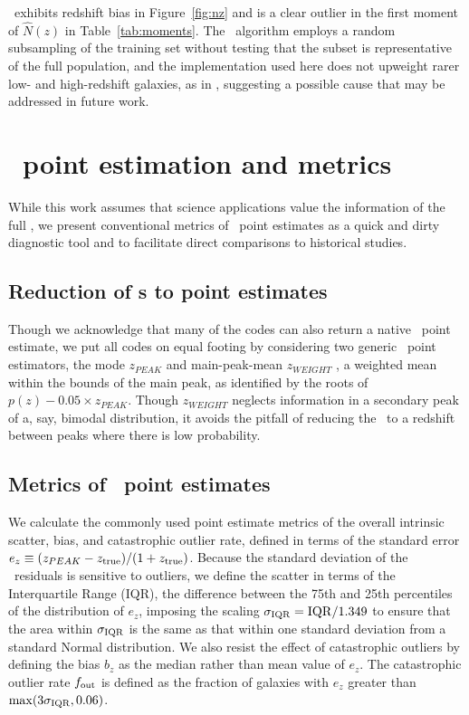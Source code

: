 \skynet\ exhibits redshift bias in Figure~\ref{fig:nz} and is a clear outlier in the first moment of $\hat{N}(z)$ in Table~\ref{tab:moments}.
The \skynet\ algorithm employs a random subsampling of the training set without testing that the subset is representative of the full population, and the implementation used here does not upweight rarer low- and high-redshift galaxies, as in \citet{Bonnett:15}, suggesting a possible cause that may be addressed in future work.

\section{\Pz\ point estimation and metrics}

While this work assumes that science applications value the information of the full \pzpdf, we present conventional metrics of \pz\ point estimates as a quick and dirty diagnostic tool and to facilitate direct comparisons to historical studies.

\subsection{Reduction of \pzpdf s to point estimates}

Though we acknowledge that many of the codes can also return a native \pz\ point estimate, we put all codes on equal footing by considering two generic \pz\ point estimators, the mode $z_{PEAK}$ and main-peak-mean $z_{WEIGHT}$ \citep{Dahlen:13}, a weighted mean within the bounds of the main peak, as identified by the roots of $p(z) - 0.05 \times z_{PEAK}$.
Though $z_{WEIGHT}$ neglects information in a secondary peak of a, say, bimodal distribution, it avoids the pitfall of reducing the \pzpdf\ to a redshift between peaks where there is low probability.

\subsection{Metrics of \pz\ point estimates}

We calculate the commonly used point estimate metrics of the overall intrinsic scatter, bias, and catastrophic outlier rate, defined in terms of the standard error $e_{z} \equiv (z_{PEAK} - z_{\rm true}) / (1 + z_{\rm true})$.
Because the standard deviation of the \pz\ residuals is sensitive to outliers, we define the scatter in terms of the Interquartile Range (IQR), the difference between the 75th and 25th percentiles of the distribution of $e_{z}$, imposing the scaling $\sigma_{\rm IQR} = \rm{IQR} / 1.349$ to ensure that the area within $\sigma_{\rm IQR}$ is the same as that within one standard deviation from a standard Normal distribution.
We also resist the effect of catastrophic outliers by defining the bias $b_{z}$ as the median rather than mean value of $e_{z}$.
The catastrophic outlier rate $f_{\rm out}$ is defined as the fraction of galaxies with $e_{z}$ greater than $\max(3 \sigma_{\rm IQR}, 0.06)$.

